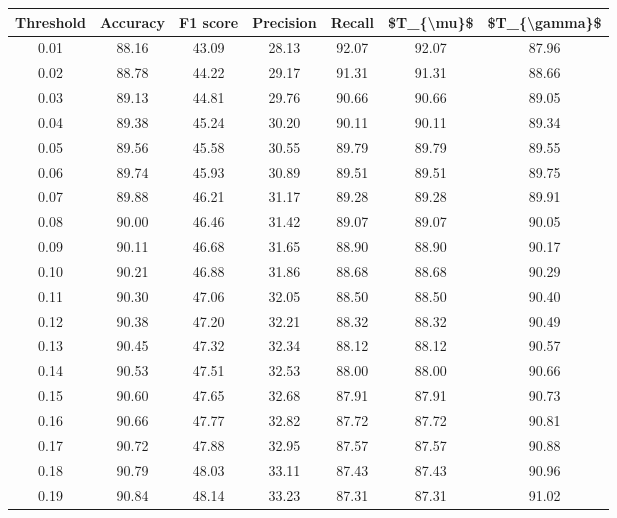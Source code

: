 \begin{tabular}{|c|c|c|c|c|c|c|}
\hline
 Threshold &  Accuracy &  F1 score &  Precision &  Recall &  \$T\_\{\textbackslash mu\}\$ &  \$T\_\{\textbackslash gamma\}\$ \\
\hline
      0.01 &     88.16 &     43.09 &      28.13 &   92.07 &      92.07 &         87.96 \\
      0.02 &     88.78 &     44.22 &      29.17 &   91.31 &      91.31 &         88.66 \\
      0.03 &     89.13 &     44.81 &      29.76 &   90.66 &      90.66 &         89.05 \\
      0.04 &     89.38 &     45.24 &      30.20 &   90.11 &      90.11 &         89.34 \\
      0.05 &     89.56 &     45.58 &      30.55 &   89.79 &      89.79 &         89.55 \\
      0.06 &     89.74 &     45.93 &      30.89 &   89.51 &      89.51 &         89.75 \\
      0.07 &     89.88 &     46.21 &      31.17 &   89.28 &      89.28 &         89.91 \\
      0.08 &     90.00 &     46.46 &      31.42 &   89.07 &      89.07 &         90.05 \\
      0.09 &     90.11 &     46.68 &      31.65 &   88.90 &      88.90 &         90.17 \\
      0.10 &     90.21 &     46.88 &      31.86 &   88.68 &      88.68 &         90.29 \\
      0.11 &     90.30 &     47.06 &      32.05 &   88.50 &      88.50 &         90.40 \\
      0.12 &     90.38 &     47.20 &      32.21 &   88.32 &      88.32 &         90.49 \\
      0.13 &     90.45 &     47.32 &      32.34 &   88.12 &      88.12 &         90.57 \\
      0.14 &     90.53 &     47.51 &      32.53 &   88.00 &      88.00 &         90.66 \\
      0.15 &     90.60 &     47.65 &      32.68 &   87.91 &      87.91 &         90.73 \\
      0.16 &     90.66 &     47.77 &      32.82 &   87.72 &      87.72 &         90.81 \\
      0.17 &     90.72 &     47.88 &      32.95 &   87.57 &      87.57 &         90.88 \\
      0.18 &     90.79 &     48.03 &      33.11 &   87.43 &      87.43 &         90.96 \\
      0.19 &     90.84 &     48.14 &      33.23 &   87.31 &      87.31 &         91.02 \\

\end{tabular}
